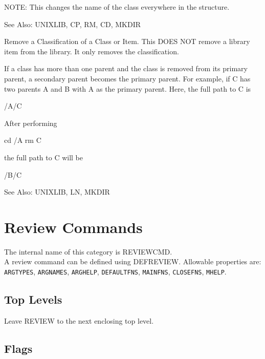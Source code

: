 \begin{description}
NOTE:  This changes the name of the class everywhere in the structure.

See Also:  UNIXLIB, CP, RM, CD, MKDIR

\item[RM]  
Remove a Classification of a Class or Item.  This 
DOES NOT remove a library item from the library.  It only
removes the classification.

If a class has more than one parent and the class is removed
from its primary parent, a secondary parent becomes the primary
parent.  For example, if C has two parents A and B with A as the
primary parent.  Here, the full path to C is

/A/C

After performing

cd /A
rm C

the full path to C will be

/B/C

See Also: UNIXLIB, LN, MKDIR
\item
\end{description}
\chapter{Review Commands}
The internal name of this category is 
REVIEWCMD.\\
A review command can be defined using DEFREVIEW.
Allowable properties are: \texttt{ARGTYPES}, \texttt{ARGNAMES}, \texttt{ARGHELP}, \texttt{DEFAULTFNS}, \texttt{MAINFNS}, \texttt{CLOSEFNS}, \texttt{MHELP}.

\section{Top Levels}

\begin{description} 
\item[LEAVE]  
Leave REVIEW to the next enclosing top level.
\item
\end{description}

\section{Flags}

